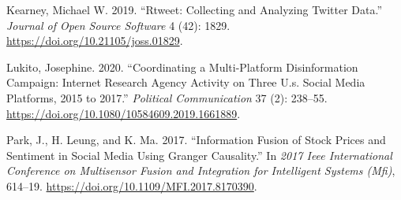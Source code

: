 \documentclass[12pt,]{article}
\begin{document}
\leavevmode\hypertarget{ref-rtweet}{}%
Kearney, Michael W. 2019. ``Rtweet: Collecting and Analyzing Twitter
Data.'' \emph{Journal of Open Source Software} 4 (42): 1829.
\url{https://doi.org/10.21105/joss.01829}.

\leavevmode\hypertarget{ref-lukito2020}{}%
Lukito, Josephine. 2020. ``Coordinating a Multi-Platform Disinformation
Campaign: Internet Research Agency Activity on Three U.s. Social Media
Platforms, 2015 to 2017.'' \emph{Political Communication} 37 (2):
238--55. \url{https://doi.org/10.1080/10584609.2019.1661889}.

\leavevmode\hypertarget{ref-park2017}{}%
Park, J., H. Leung, and K. Ma. 2017. ``Information Fusion of Stock
Prices and Sentiment in Social Media Using Granger Causality.'' In
\emph{2017 Ieee International Conference on Multisensor Fusion and
Integration for Intelligent Systems (Mfi)}, 614--19.
\url{https://doi.org/10.1109/MFI.2017.8170390}.





\newpage
\singlespacing 
\end{document}
